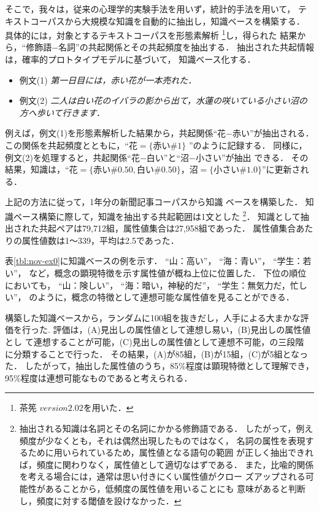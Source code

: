 そこで，我々は，従来の心理学的実験手法を用いず，統計的手法を用いて，
テキストコーパスから大規模な知識を自動的に抽出し，知識ベースを構築する．
具体的には，対象とするテキストコーパスを形態素解析
\footnote{茶筅 $version 2.02$\cite{Chasen1999j}を用いた．}し，得られた
結果から，``修飾語−名詞''の共起関係とその共起頻度を抽出する．
抽出された共起情報は，確率的プロトタイプモデルに基づいて，
知識ベース化する．
\begin{itemize}
\item[] 例文(1) {\em 第一日目には，赤い花が一本売れた\cite{Dazai1947j}．}
\item[] 例文(2) {\em 二人は白い花のイバラの影から出て，水蓮の咲いている小さい沼の方へ歩いて行きます\cite{Dazai1988jb}．}
\end{itemize}
例えば，例文(1)を形態素解析した結果から，共起関係``花−赤い''が抽出される．
この関係を共起頻度とともに，``$花 = \{赤い\#1\}$ ''のように記録する．
同様に，例文(2)を処理すると，共起関係``花−白い''と``沼−小さい''が抽出
できる．
その結果，知識は，``$花 = \{赤い\#0.50, 白い\#0.50\}，
沼 = \{小さい\#1.0\}$''に更新される．

上記の方法に従って，1年分の新聞記事コーパス\cite{Mainichi1995j}から知識
ベースを構築した．
知識ベース構築に際して，知識を抽出する共起範囲は1文とした
\footnote{
抽出される知識は名詞とその名詞にかかる修飾語である．
したがって，例え頻度が少なくとも，それは偶然出現したものではなく，
名詞の属性を表現するために用いられているため，属性値となる語句の範囲
が正しく抽出できれば，頻度に関わりなく，属性値として適切なはずである．
また，比喩的関係を考える場合には，通常は思い付きにくい属性値がクロー
ズアップされる可能性があることから，低頻度の属性値を用いることにも
意味があると判断し，頻度に対する閾値を設けなかった．
}．
知識として抽出された共起ペアは79,712組，属性値集合は27,958組であった．
属性値集合あたりの属性値数は1〜339，平均は2.5であった．

表\ref{tbl:nov-ex0}に知識ベースの例を示す．
``山：高い''，
``海：青い''，
``学生：若い''，
など，概念の顕現特徴を示す属性値が概ね上位に位置した．
下位の順位においても，
``山：険しい''，
``海：暗い，神秘的だ''，
``学生：無気力だ，忙しい''，
のように，概念の特徴として連想可能な属性値を見ることができる．

構築した知識ベースから，ランダムに100組を抜きだし，人手による大まかな評
価を行った.
評価は，(A)見出しの属性値として連想し易い，(B)見出しの属性値とし
て連想することが可能，(C)見出しの属性値として連想不可能，の三段階
に分類することで行った．
その結果，(A)が85組，(B)が15組，(C)が5組となった．
したがって，抽出した属性値のうち，85\%程度は顕現特徴として理解でき，
95\%程度は連想可能なものであると考えられる．

